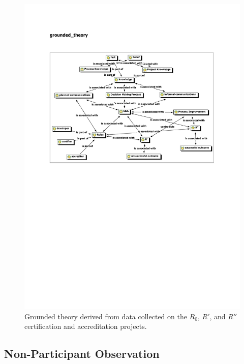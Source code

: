 \documentclass[10pt,letterpaper,conference]{IEEEtran}
\begin{document}
\begin{figure}[!t]
    \centering
	\includegraphics[width=\textwidth,trim=24mm 142mm 25mm 45mm,clip]{network_grounded_theory.pdf}
	\caption{Grounded theory derived from data collected on the $R_0$, $R'$, and $R''$
		certification and accreditation projects.}
	\label{figure:grounded-theory}
\end{figure}

\subsection{Non-Participant Observation}
\end{document}

